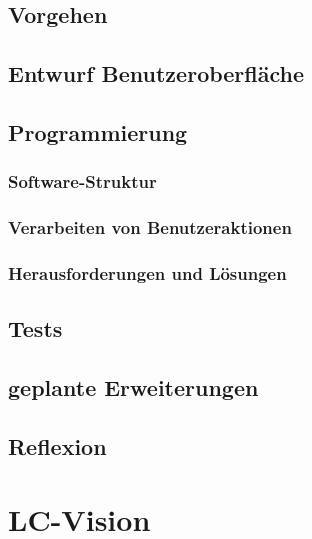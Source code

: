 \documentclass[10pt,a4paper]{article}
\begin{document}
\subsection{Vorgehen}
\subsection{Entwurf Benutzeroberfläche}
\subsection{Programmierung}
\subsubsection{Software-Struktur}
\subsubsection{Verarbeiten von Benutzeraktionen}
\subsubsection{Herausforderungen und Lösungen}
\subsection{Tests}
\subsection{geplante Erweiterungen}
\subsection{Reflexion}

\section{LC-Vision}
\end{document}
